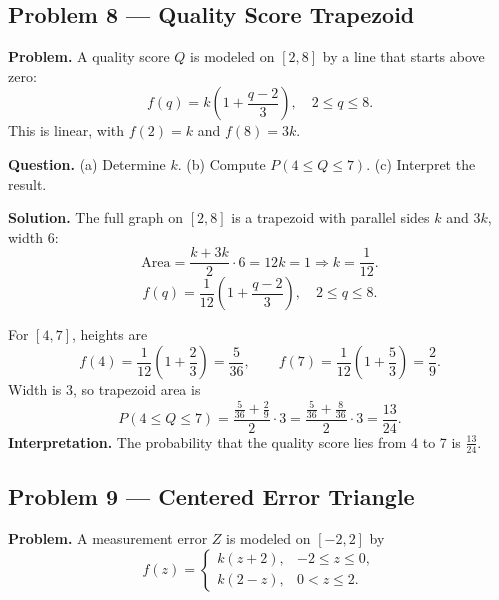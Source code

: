 \begin{ExamProblems}
		\item
		\subsection*{Problem 8 — Quality Score Trapezoid}
		
		\textbf{Problem.}
		A quality score $Q$ is modeled on $[2,8]$ by a line that starts above zero:
		\[
		f(q)=k\left(1+\frac{q-2}{3}\right),\quad 2\le q\le 8.
		\]
		This is linear, with $f(2)=k$ and $f(8)=3k$.
		
		\textbf{Question.}
		(a) Determine $k$.
		(b) Compute $P(4\le Q\le 7)$.
		(c) Interpret the result.
		
		\textbf{Solution.}
		The full graph on $[2,8]$ is a trapezoid with parallel sides $k$ and $3k$, width $6$:
		\[
		\text{Area}=\frac{k+3k}{2}\cdot 6=12k=1\Rightarrow k=\frac{1}{12}.
		\]
		\[
		f(q)=\frac{1}{12}\left(1+\frac{q-2}{3}\right),\quad 2\le q\le 8.
		\]
		\begin{center}
		\end{center}
		For $[4,7]$, heights are
		\[
		f(4)=\frac{1}{12}\left(1+\frac{2}{3}\right)=\frac{5}{36},\qquad
		f(7)=\frac{1}{12}\left(1+\frac{5}{3}\right)=\frac{2}{9}.
		\]
		Width is $3$, so trapezoid area is
		\[
		P(4\le Q\le 7)=\frac{\frac{5}{36}+\frac{2}{9}}{2}\cdot 3
		=\frac{\frac{5}{36}+\frac{8}{36}}{2}\cdot 3
		=\frac{13}{24}.
		\]
		\textbf{Interpretation.} The probability that the quality score lies from 4 to 7 is $\frac{13}{24}$.
		
		
		\item
		\subsection*{Problem 9 — Centered Error Triangle}
		
		\textbf{Problem.}
		A measurement error $Z$ is modeled on $[-2,2]$ by
		\[
		f(z)=\begin{cases}
		k(z+2), & -2\le z\le 0,\\
		k(2-z), & 0< z\le 2.
		\end{cases}
		\]
		

\end{ExamProblems}
